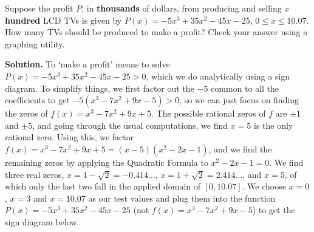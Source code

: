 \documentclass{ximera}
\begin{document}
\begin{example} Suppose the profit $P$, in \textbf{thousands} of dollars, from producing and selling $x$ \textbf{hundred} LCD TVs is given by  $P(x)=-5x^3+35x^2-45x-25$, $0 \leq x \leq 10.07$.  How many TVs should be produced to make a profit?  Check your answer using a graphing utility.

\smallskip

{\bf Solution.}  To `make a profit' means to solve $P(x) = -5x^3+35x^2-45x-25 > 0$, which we do analytically using a sign diagram.  To simplify things, we first factor out the $-5$ common to all the coefficients to get $-5\left(x^3 - 7x^2+9x-5\right) > 0$, so we can just focus on finding the zeros of $f(x) = x^3-7x^2+9x+5$.  The possible rational zeros of $f$ are $\pm 1$ and $\pm 5$, and going through the usual computations, we find $x=5$ is the only rational zero.  Using this, we factor $f(x) = x^3-7x^2+9x+5 = (x-5) \left(x^2-2x-1\right)$, and we find the remaining zeros by applying the Quadratic Formula to $x^2-2x-1 = 0$.  We find three real zeros,  $x=1-\sqrt{2} = -0.414 \ldots$,  $x = 1+\sqrt{2} = 2.414 \ldots$, and $x = 5$, of which only the last two fall in the applied domain of $[0, 10.07]$.  We choose $x=0$, $x=3$ and $x=10.07$ as our test values and plug them into the function $P(x)=-5x^3+35x^2-45x-25$ (not $f(x) =x^3 - 7x^2+9x-5$) to get the sign diagram below.

\begin{center}

\begin{image}
\end{image}
\end{center}
\end{example}
\end{document}
